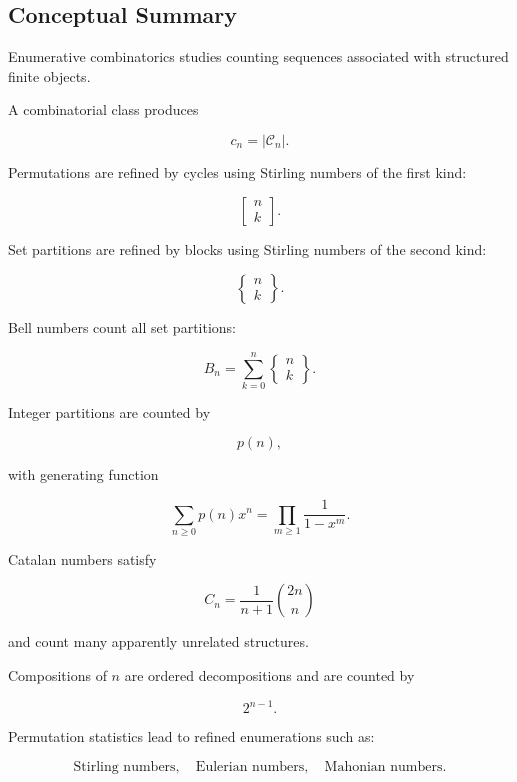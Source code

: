 \subsection{Conceptual Summary}
\label{subsec:enumerative-combinatorics-summary}

Enumerative combinatorics studies counting sequences associated with
structured finite objects.

A combinatorial class produces

\[
\boxed{
c_n=|\mathcal{C}_n|.
}
\]

Permutations are refined by cycles using Stirling numbers of the first
kind:

\[
\boxed{
\left[
\begin{matrix}
n\\
k
\end{matrix}
\right].
}
\]

Set partitions are refined by blocks using Stirling numbers of the
second kind:

\[
\boxed{
\left\{
\begin{matrix}
n\\
k
\end{matrix}
\right\}.
}
\]

Bell numbers count all set partitions:

\[
\boxed{
B_n
=
\sum_{k=0}^{n}
\left\{
\begin{matrix}
n\\
k
\end{matrix}
\right\}.
}
\]

Integer partitions are counted by

\[
\boxed{
p(n),
}
\]

with generating function

\[
\boxed{
\sum_{n\geq0}p(n)x^n
=
\prod_{m\geq1}\frac{1}{1-x^m}.
}
\]

Catalan numbers satisfy

\[
\boxed{
C_n
=
\frac{1}{n+1}\binom{2n}{n}
}
\]

and count many apparently unrelated structures.

Compositions of \(n\) are ordered decompositions and are counted by

\[
\boxed{
2^{n-1}.
}
\]

Permutation statistics lead to refined enumerations such as:

\[
\boxed{
\text{Stirling numbers},
\quad
\text{Eulerian numbers},
\quad
\text{Mahonian numbers}.
}
\]

